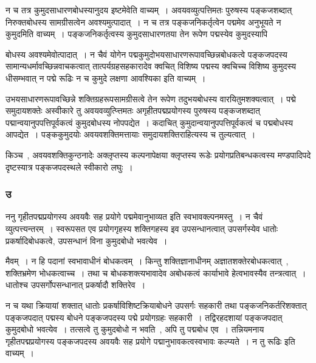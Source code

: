 				न च तत्र कुमुदसाधारणबोधस्यानुदय  इष्टमेवेति वाच्यम्~। अवयवव्युत्पत्तिमतः  पुरुषस्य पङ्कजशब्दात् निरुक्तबोधस्य सामग्रीसत्वेन अवश्यमुत्पादात्~। न च तत्र पङ्कजनिकर्तृत्वेन पद्ममेव अनुभूयते  न कुमुदमिति वाच्यम्~। पङ्कजनिकर्तृत्वस्य कुमुदसाधारणतया तेन रूपेण पद्मस्येव कुमुदस्यापि
	
				बोधस्य अवश्यमेवोत्पादात्~। न चैवं योगेन पद्मकुमुदोभयसाधारणरूपावच्छिन्नबोधकत्वे पङ्कजपदस्य सामान्यधर्मावच्छिन्नवाचकत्वात् तात्पर्यग्रहसहकारादेव क्वचित् विशिष्य पद्मस्य क्वचिच्च विशिष्य कुमुदस्य धीसम्भवात् न पद्मे रूढिः न च कुमुदे लक्षणा आवश्यिका इति वाच्यम्~। 

				उभयसाधारणरूपावच्छिन्ने शक्तिग्रहरूपसामग्रीसत्वे तेन रूपेण तदुभयबोधस्य वारयितुमशक्यत्वात्~। पद्मे समुदायशक्तेः अस्वीकारे तु अवयवव्युत्प्त्तिमतः अगृहीतपद्मप्रयोगस्य पुरुषस्य पङ्कजशब्दात् पद्मान्वयानुपपत्तिपूर्वकत्वं  कुमुदबोधस्य नोपपद्येत~। कदाचित् कुमुदान्वयानुपपत्तिपूर्वकत्वं च पद्मबोधस्य आपद्येत~। पङ्ककुमुदयोः अवयवशक्तिमत्तायाः समुदायशक्तिराहित्यस्य च  तुल्यत्वात्~।

				किञ्च~, अवयवशक्तिकुन्ठनादेः अक्लृप्तस्य कल्पनापेक्षया क्लृप्तस्य रूडेः  प्रयोगप्रतिबन्धकत्वस्य मण्डपादिपदे दृष्टस्यात्र पङ्कजपदस्थले  स्वीकारो लघुः~।
			
			\subsubsection{उ}

				\begin{small}

					ननु गृहीतपद्मप्रयोगस्य अवयवैः सह प्रयोगे पद्ममेवानुभाव्यत इति स्वभावक्ल्पनमस्तु~। न चैवं व्युत्पत्त्यन्तरम्~। स्वरूपसत एव प्रयोगगृहस्य शक्तिगहस्य इव उपसन्धानत्वात् उपसर्गस्येव धातोः प्रकर्षादिबोधकत्वे, उपसन्धानं विना कुमुदबोधो भवत्येव~। 
					
					मैवम्~। न हि पदानां स्वभावाधीनं बोधकत्वम्~। किन्तु शक्तिज्ञानाधीनम् अज्ञातशक्तेरबोधकत्वात्~, शक्तिभ्रमेण भोधकत्वाच्च~। तथा च बोधकशक्त्यभावादेव अबोधकत्वं कार्याभावे हेत्वभावस्यैव तन्त्रत्वात्~। धातोश्च उपसर्गोपसन्धानात् प्रकर्षादौ शक्तिरेव~। 
				\end{small}

				न च यथा क्रियायां शक्तात् धातोः प्रकर्षाविशिष्टक्रियाबोधने उपसर्गः सहकारी तथा पङ्कजनिकर्तरिशक्तात् पङ्कजपदात् पद्मस्य बोधने  पङ्कजपदस्य पद्मे प्रयोगग्रहः सहकारी~। तद्विरहदशायां पङ्कजपदात् कुमुदबोधो भवत्येव~। तत्सत्वे तु कुमुदबोधो न भवति~, अपि तु पद्मबोध एव~। तन्नियमनाय गृहीतपद्मप्रयोगस्य पङ्कजपदस्य अवयवैः सह प्रयोगे पद्मानुभावकत्वस्वभावः कल्प्यते~। न तु रूढिः इति वाच्यम्~।


